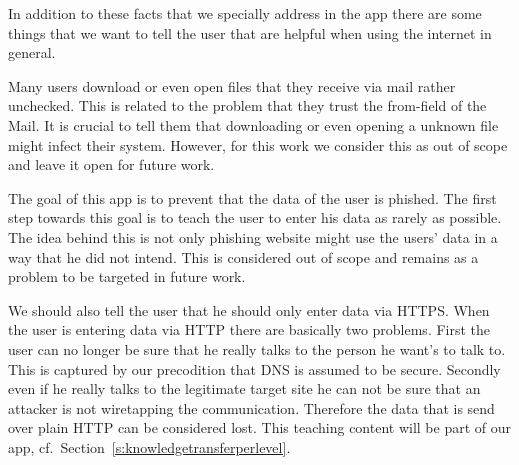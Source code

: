 In addition to these facts that we specially address in the app there are some things that we want to tell the user that are helpful when using the internet in general.
\begin{description}[leftmargin=0cm]
	\item[Do Not Download Attachment] Many users download or even open files that they receive via mail rather unchecked.
	This is related to the problem that they trust the from-field of the Mail.
	It is crucial to tell them that downloading or even opening a unknown file might infect their system.
	However, for this work we consider this as out of scope and leave it open for future work.
	\item[Data Economy] The goal of this app is to prevent that the data of the user is phished.
	The first step towards this goal is to teach the user to enter his data as rarely as possible.
	The idea behind this is not only phishing website might use the users' data in a way that he did not intend. 
	This is considered out of scope and remains as a problem to be targeted in future work.
	\item[Date Entry Via Https] We should also tell the user that he should only enter data via HTTPS. 
	When the user is entering data via HTTP there are basically two problems.
	First the user can no longer be sure that he really talks to the person he want's to talk to.
	This is captured by our precodition that DNS is assumed to be secure.
	Secondly even if he really talks to the legitimate target site he can not be sure that an attacker is not wiretapping the communication.
	Therefore the data that is send over plain HTTP can be considered lost.
	This teaching content will be part of our app, cf.~Section~\autoref{s:knowledgetransferperlevel}.	
\end{description}

